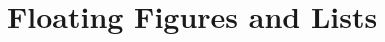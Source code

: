 \documentclass[letterpaper,twocolumn,10pt]{article}
\begin{document}
\section{Floating Figures and Lists}





\end{document}
